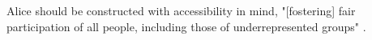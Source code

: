 \documentclass[14pt,a4paper]{article}
\begin{document}
\begin{multicols}{2}


Alice should be constructed with accessibility in mind, "[fostering] fair participation of all people, including those of underrepresented groups" \textit{\parencite[p. 2]{ACM2024}}.






\end{multicols}
\end{document}
